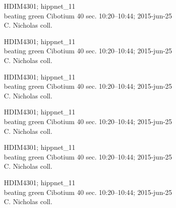 \documentclass[2pt]{extarticle}
\begin{document}
\noindent
\parbox{0.16\textwidth}{\tiny \raggedright \rule[-0.3\baselineskip]{0pt}{10pt}HDIM4301; hippnet\_11\\ beating green Cibotium 40 sec. 10:20--10:44; 2015-jun-25\\ C. Nicholas coll.}
\parbox{0.16\textwidth}{\tiny \raggedright \rule[-0.3\baselineskip]{0pt}{10pt}HDIM4301; hippnet\_11\\ beating green Cibotium 40 sec. 10:20--10:44; 2015-jun-25\\ C. Nicholas coll.}
\parbox{0.16\textwidth}{\tiny \raggedright \rule[-0.3\baselineskip]{0pt}{10pt}HDIM4301; hippnet\_11\\ beating green Cibotium 40 sec. 10:20--10:44; 2015-jun-25\\ C. Nicholas coll.}
\parbox{0.16\textwidth}{\tiny \raggedright \rule[-0.3\baselineskip]{0pt}{10pt}HDIM4301; hippnet\_11\\ beating green Cibotium 40 sec. 10:20--10:44; 2015-jun-25\\ C. Nicholas coll.}
\parbox{0.16\textwidth}{\tiny \raggedright \rule[-0.3\baselineskip]{0pt}{10pt}HDIM4301; hippnet\_11\\ beating green Cibotium 40 sec. 10:20--10:44; 2015-jun-25\\ C. Nicholas coll.}
\parbox{0.16\textwidth}{\tiny \raggedright \rule[-0.3\baselineskip]{0pt}{10pt}HDIM4301; hippnet\_11\\ beating green Cibotium 40 sec. 10:20--10:44; 2015-jun-25\\ C. Nicholas coll.} \\ 
\vspace{0.001in} 
\end{document}
